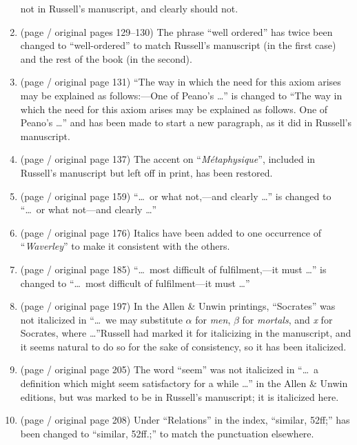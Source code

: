 \begin{enumerate}[noitemsep,label=\alph*)]
not in Russell's manuscript, and clearly should not.
\item (page \pageref{change:wellordered} / original pages 129--130) The phrase ``well ordered'' has twice
been changed to ``well-ordered'' to match Russell's man\-u\-script (in the first case) and the rest of the book (in the second).
\item (page \pageref{change:minor131} / original page 131) ``The way in which 
the need for this axiom arises may
be explained as follows:---One 
of Peano's \ldots'' is chang\-ed to
``The way in which the need for this axiom arises may be 
explained as follows. One of Peano's \ldots'' and has been made to start 
a new paragraph, as it did in Russell's manuscript.
\item (page \pageref{change:minor137} / original page 137) The accent on ``\textit{M{\'e}t\-a\-phys\-ique}'', included
in Russell's man\-u\-script but left off in print, has been restored.
  \item (page \pageref{change:minor159} / original page 159) ``\ldots\ or what not,---and clearly \ldots'' is changed to ``\ldots\ or what not---and clearly \ldots''
\item (page \pageref{minor:waverley} / original page 176) Italics have been added to one occurrence of ``\textit{Waverley}'' to make it consistent with the others.
 \item (page \pageref{change:minor185} / original page 185) ``\ldots\ most difficult
of
ful\-fil\-ment,---it must \ldots'' is changed to ``\ldots\ most difficult
of
ful\-fil\-ment---it must \ldots'' 
\item (page \pageref{minor:italicsocrates} / original page 197)  In the Allen \& Unwin printings, ``Soc\-rat\-es'' was
not italicized in ``\ldots\ we may substitute \ensuremath{\alpha} for \textit{men}, \ensuremath{\beta} for
\textit{mortals},
and \textit{x} for Socrates, where \ldots''\kksentencespace Russell had marked it for italicizing in the manuscript, and it seems
natural to do so for the sake of consistency, so it has been italicized.
\item (page \pageref{change:minor205} / original page 205) The word ``seem'' was not italicized
in ``\ldots\ a definition which might seem satisfactory for a while \ldots'' in the Allen \& Unwin editions, but was 
marked to be in 
Russell's manuscript; it is italicized here.%
\item (page \pageref{minor:208} / original page 208) Under ``Relations'' in the index, ``similar, 52ff;'' has been changed to ``similar, 52ff.;'' to match the punctuation elsewhere.
\end{enumerate}

